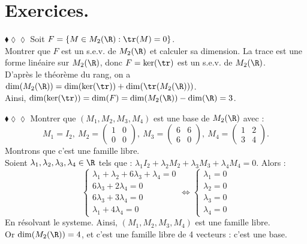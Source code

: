 \documentclass[11pt]{article}
\begin{document}


\thispagestyle{fancy}

\section{Exercices.}

\begin{exercice}{$\blacklozenge\lozenge\lozenge$}{}
    Soit $F=\{M \in M_2(\R) : \tr(M) = 0\}$.\\
    Montrer que $F$ est un s.e.v. de $M_2(\R)$ et calculer sa dimension.
    \tcblower
    La trace est une forme linéaire sur $M_2(\R)$, donc $F = \ker(\tr)$ est un s.e.v. de $M_2(\R)$.\\
    D'après le théorème du rang, on a $\dim(M_2(\R)) = \dim(\ker(\tr)) + \dim(\tr(M_2(\R)))$.\\
    Ainsi, $\dim(\ker(\tr))=\dim(F)=\dim(M_2(\R))-\dim(\R)=3$.
\end{exercice}

\begin{exercice}{$\blacklozenge\lozenge\lozenge$}{}
    Montrer que $(M_1, M_2, M_3, M_4)$ est une base de $M_2(\R)$ avec :
    \begin{equation*}
        M_1 = I_2, ~ M_2 = \begin{pmatrix} 1 & 0 \\ 0 & 0 \end{pmatrix}, ~ M_3 = \begin{pmatrix} 6 & 6 \\ 6 & 0 \end{pmatrix}, ~ M_4 = \begin{pmatrix} 1 & 2 \\ 3 & 4 \end{pmatrix}.
    \end{equation*}
    \tcblower
    Montrons que c'est une famille libre.\\
    Soient $\lambda_1, \lambda_2, \lambda_3, \lambda_4 \in \R$ tels que : $\lambda_1I_2 + \lambda_2M_2 + \lambda_3M_3 + \lambda_4M_4 = 0$.
    Alors :
    \begin{equation*}
        \begin{cases}
            \lambda_1 + \lambda_2 + 6\lambda_3 + \lambda_4 = 0\\
            6\lambda_3 + 2\lambda_4 = 0\\
            6\lambda_3 + 3\lambda_4 = 0\\
            \lambda_1 + 4\lambda_4 = 0
        \end{cases}
        \iff
        \begin{cases}
            \lambda_1 = 0\\
            \lambda_2 = 0\\
            \lambda_3 = 0\\
            \lambda_4 = 0
        \end{cases}
    \end{equation*}
    En résolvant le systeme. Ainsi, $(M_1, M_2, M_3, M_4)$ est une famille libre.\\
    Or $\dim(M_2(\R))=4$, et c'est une famille libre de 4 vecteurs : c'est une base.
\end{exercice}
\end{document}
